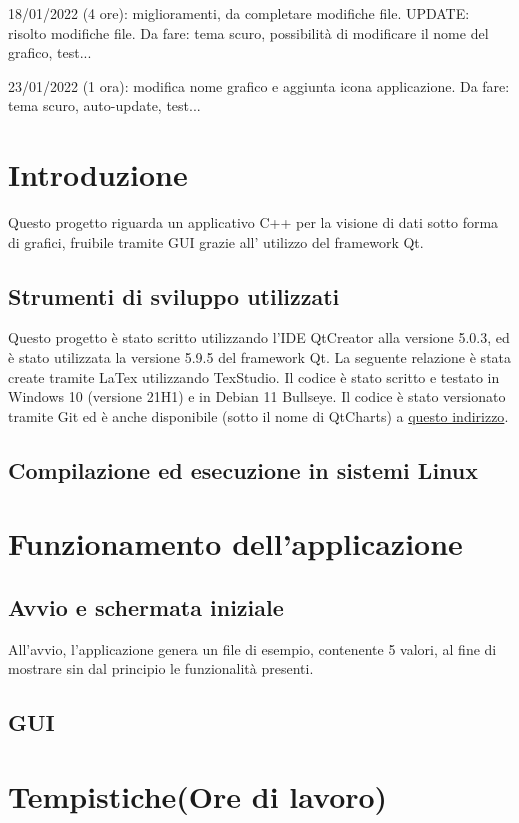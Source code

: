 \documentclass[10pt]{article}
\begin{document}
    18/01/2022 (4 ore): miglioramenti, da completare modifiche file. UPDATE: risolto modifiche file. Da fare: tema scuro, possibilità di modificare il nome del grafico, test...
    
    23/01/2022 (1 ora): modifica nome grafico e aggiunta icona applicazione. Da fare: tema scuro, auto-update, test...
    
    \newpage
    \tableofcontents
    \newpage
    \section{Introduzione}
     Questo progetto riguarda un applicativo C++ per la visione di dati sotto forma di grafici, fruibile tramite GUI grazie all' utilizzo del framework Qt.
    \subsection{Strumenti di sviluppo utilizzati}
    Questo progetto è stato scritto utilizzando l'IDE QtCreator alla versione 5.0.3, ed è stato utilizzata la versione 5.9.5 del framework Qt. 
    La seguente relazione è stata create tramite LaTex utilizzando TexStudio.
    Il codice è stato scritto e testato in Windows 10 (versione 21H1) e in Debian 11 Bullseye.
    Il codice è stato versionato tramite Git ed è anche disponibile (sotto il nome di QtCharts) a \href{https://github.com/nicolabaesso/qtCharts}{questo indirizzo}.
    \subsection{Compilazione ed esecuzione in sistemi Linux}
    \section{Funzionamento dell'applicazione}
    \subsection{Avvio e schermata iniziale}
    All'avvio, l'applicazione genera un file di esempio, contenente 5 valori, al fine di mostrare sin dal principio le funzionalità presenti.
    \subsection{GUI}
    \section{Tempistiche(Ore di lavoro)}
\end{document}
